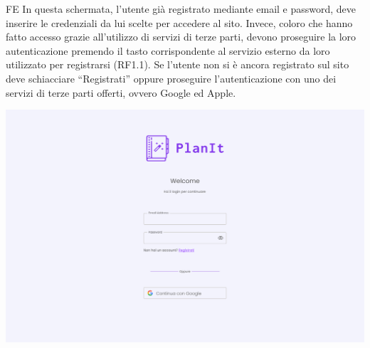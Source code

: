 \begin{listaPersonale}{FE}
     In questa schermata, l’utente già registrato mediante email e password, deve inserire le credenziali da lui scelte per accedere al sito. Invece, coloro che hanno fatto accesso grazie all’utilizzo di servizi di terze parti, devono proseguire la loro autenticazione premendo il tasto corrispondente al servizio esterno da loro utilizzato per registrarsi (RF1.1).
    Se l’utente non si è ancora registrato sul sito deve schiacciare “Registrati” oppure proseguire l’autenticazione con uno dei servizi di terze parti offerti, ovvero Google ed Apple.
    \begin{center}
        \includegraphics[width=1\textwidth]{img/FrontEnd/Login.png}
    \end{center}
    \pagebreak %
    

\end{listaPersonale}
